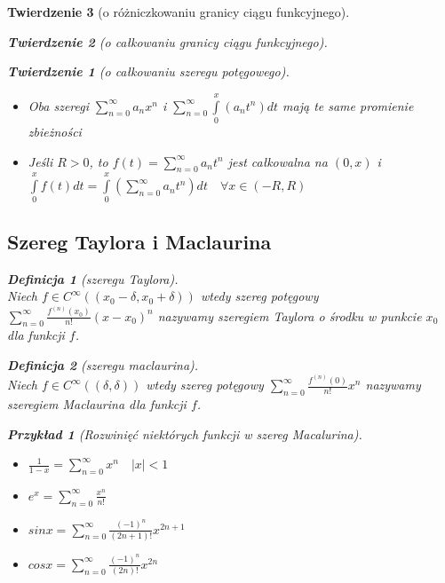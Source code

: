 \documentclass[12pt,a4paper]{article}
\newtheorem{tw}{Twierdzenie}
\newtheorem{przyklad}{Przykład}
\theoremstyle{definition}
\newtheorem{df}{Definicja}
\begin{document}
\begin{tw}[o różniczkowaniu granicy ciągu funkcyjnego]
\begin{tw}[o całkowaniu granicy ciągu funkcyjnego]
\begin{tw}[o całkowaniu szeregu potęgowego]~\\
\begin{itemize}
	\item Oba szeregi $\sum\limits_{n=0}^\infty a_nx^n$ i $\sum\limits_{n=0}^\infty \int\limits_0^x (a_nt^n)dt$ mają te same promienie zbieżności
	\item Jeśli $R > 0$, to $f(t) = \sum\limits_{n=0}^\infty a_nt^n$ jest całkowalna na $(0, x)$ i $\int\limits_0^x f(t)dt = \int\limits_0^x(\sum\limits_{n=0}^\infty a_nt^n)dt \quad \forall x\in (-R,R)$
\end{itemize}
\end{tw}

\subsection{Szereg Taylora i Maclaurina}
\begin{df}[szeregu Taylora]~\\
Niech $f\in C^\infty ((x_0-\delta, x_0+\delta))$ wtedy szereg potęgowy $\sum\limits_{n=0}^\infty \frac{f^{(n)}(x_0)}{n!}(x-x_0)^n$ nazywamy szeregiem Taylora o środku w punkcie $x_0$ dla funkcji $f$.
\end{df}

\begin{df}[szeregu maclaurina]~\\
Niech $f\in C^\infty ((\delta, \delta))$ wtedy szereg potęgowy $\sum\limits_{n=0}^\infty \frac{f^{(n)}(0)}{n!}x^n$ nazywamy szeregiem Maclaurina dla funkcji $f$.
\end{df}

\begin{przyklad}[Rozwinięć niektórych funkcji w szereg Macalurina]~\\
\begin{itemize}
	\item $\frac{1}{1-x} = \sum\limits_{n=0}^\infty x^n \quad |x| < 1$
	\item $e^x = \sum\limits_{n=0}^\infty \frac{x^n}{n!}$
	\item $sinx = \sum\limits_{n=0}^\infty \frac{(-1)^n}{(2n+1)!}x^{2n+1}$
	\item $cosx = \sum\limits_{n=0}^\infty \frac{(-1)^n}{(2n)!}x^{2n}$
\end{itemize}


\end{przyklad}
\end{tw}
\end{tw}
\end{document}
